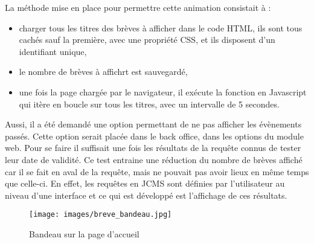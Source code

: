 \documentclass[12pt,a4paper]{article}
\begin{document}
La méthode mise en place pour permettre cette animation consistait à :
\begin{itemize}
\item charger tous les titres des brèves à afficher dans le code HTML, ils sont tous cachés sauf la première, avec une propriété CSS, et ils disposent d'un identifiant unique,
\item le nombre de brèves à affichrt est sauvegardé,
\item une fois la page chargée par le navigateur, il exécute la fonction en Javascript qui itère en boucle sur tous les titres, avec un intervalle de 5 secondes.
\end{itemize}
Aussi, il a été demandé une option permettant de ne pas afficher les évènements passés. Cette option serait placée dans le back office, dans les options du module web. Pour se faire il suffisait une fois les résultats de la requête connus de tester leur date de validité. Ce test entraine une réduction du nombre de brèves affiché car il se fait en aval de la requête, mais ne pouvait pas avoir lieux en même temps que celle-ci. En effet, les requêtes en \gls{JCMS} sont définies par l'utilisateur au niveau d'une interface et ce qui est développé est l'affichage de ces résultats.\par
\begin{figure}[h!]
\centering\texttt{[image: images/breve\_bandeau.jpg]} 
\caption{Bandeau sur la page d'accueil}
\end{figure}
\end{document}
